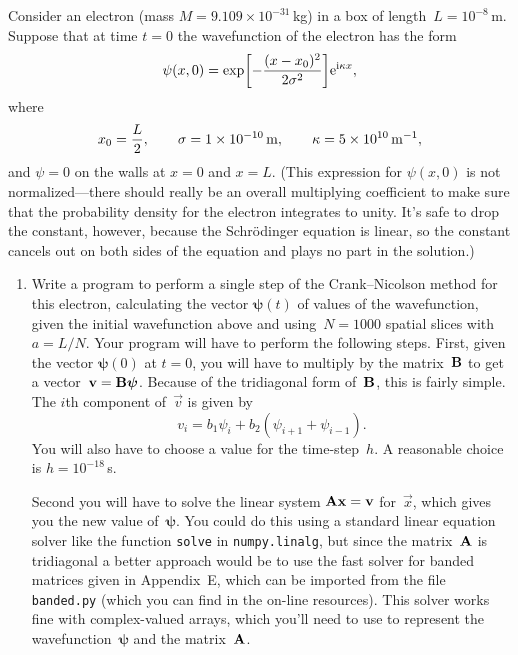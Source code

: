 \documentclass[12pt]{article}
\begin{document}
\begin{exercises}
Consider an electron (mass $M=9.109\times10^{-31}\,$kg) in a box of
length~$L=10^{-8}\,$m.  Suppose that at time $t=0$ the wavefunction of the
electron has the form
\begin{displaymath}
\psi(x,0) = \exp \biggl[ -{(x-x_0)^2\over2\sigma^2} \biggr]
            \mathrm{e}^{\mathrm{i}\kappa x},
\end{displaymath}
where
\begin{displaymath}
x_0 = {L\over2},\qquad
\sigma = 1\times10^{-10}\,\mathrm{m},\qquad
\kappa = 5\times10^{10}\,\mathrm{m}^{-1},
\end{displaymath}
and $\psi=0$ on the walls at $x=0$ and $x=L$.  (This expression for
$\psi(x,0)$ is not normalized---there should really be an overall
multiplying coefficient to make sure that the probability density for the
electron integrates to unity.  It's safe to drop the constant, however,
because the Schr\"odinger equation is linear, so the constant cancels out
on both sides of the equation and plays no part in the solution.)

\begin{enumerate}\setlength{\itemsep}{0pt}
\item Write a program to perform a single step of the
  Crank--Nicolson method for this electron, calculating the vector
  $\boldsymbol{\psi}(t)$ of values of the wavefunction, given the initial
  wavefunction above and using~$N=1000$ spatial slices with $a=L/N$.  Your
  program will have to perform the following steps.  First, given the
  vector $\boldsymbol{\psi}(0)$ at $t=0$, you will have to multiply by the
  matrix~$\mathbf{B}$ to get a vector~$\mathbf{v} = \mathbf{B}\boldsymbol{\psi}$.
  Because of the tridiagonal form of~$\mathbf{B}$, this is fairly simple.  The
  $i$th component of~$\vec{v}$ is given by
\begin{displaymath}
v_i = b_1\psi_i + b_2(\psi_{i+1}+\psi_{i-1}).
\end{displaymath}
You will also have to choose a value for the time-step~$h$.  A reasonable
choice is $h=10^{-18}\,$s.

Second you will have to solve the linear system $\mathbf{A}\mathbf{x}=\mathbf{v}$
for~$\vec{x}$, which gives you the new value of~$\boldsymbol{\psi}$.  You
could do this using a standard linear equation solver like the function
\verb|solve| in \verb|numpy.linalg|, but since the matrix~$\mathbf{A}$ is
tridiagonal a better approach would be to use the fast solver for banded
matrices given in Appendix~E, which can be imported from the file
\verb|banded.py| (which you can find in the on-line resources).  This solver works fine with complex-valued arrays, which you'll need to use to represent the wavefunction~$\boldsymbol{\psi}$ and the matrix~$\mathbf{A}$.


\end{enumerate}
\end{exercises}
\end{document}
